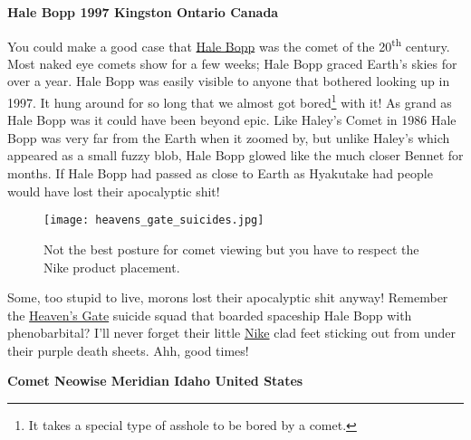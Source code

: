 \medskip

\noindent \textbf{Hale Bopp 1997 Kingston Ontario Canada}

\medskip

You could make a good case that
\href{https://en.wikipedia.org/wiki/Comet_Hale\%E2\%80\%93Bopp}{Hale
Bopp} was the comet of the 20\textsuperscript{th} century. Most naked
eye comets show for a few weeks; Hale Bopp graced Earth's skies for over
a year. Hale Bopp was easily visible to anyone that bothered looking up
in 1997. It hung around for so long that we almost got
bored\footnote{It takes a special type of asshole to be bored by a comet.
} with it! As grand as
Hale Bopp was it could have been beyond epic. Like Haley's Comet in 1986
Hale Bopp was very far from the Earth when it zoomed by, but unlike
Haley's which appeared as a small fuzzy blob, Hale Bopp glowed like the
much closer Bennet for months. If Hale Bopp had passed as close to Earth
as Hyakutake had people would have lost their apocalyptic shit!


\captionsetup[figure]{labelformat=empty}
\begin{SCfigure}
\centering
\texttt{[image: heavens\_gate\_suicides.jpg]}
\caption[Not the best posture for comet viewing]{Not the best posture for comet viewing but you have to respect
the Nike product placement.}
\label{fig:6024x0}
\end{SCfigure}

Some, too stupid to live, morons lost their apocalyptic shit anyway!
Remember the
\href{https://www.escondidograpevine.com/2020/03/25/20-years-ago-heavens-gate-couldnt-wait/}{Heaven's
Gate} suicide squad that boarded spaceship Hale Bopp with phenobarbital?
I'll never forget their little
\href{https://solecollector.com/news/2015/03/nike-decade-heavens-gate-sneakers}{Nike}
clad feet sticking out from under their purple death sheets. Ahh, good
times!

\medskip

\noindent \textbf{Comet Neowise Meridian Idaho United States}

\medskip


